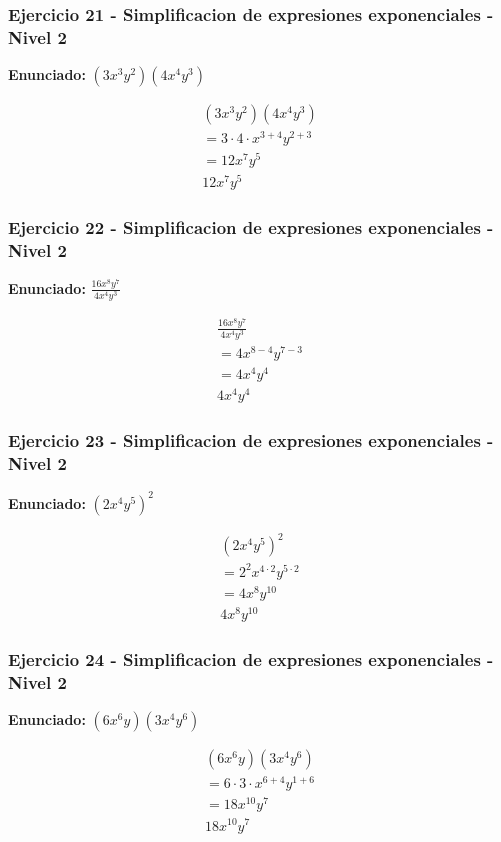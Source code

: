 \documentclass[12pt,a4paper]{article}
\begin{document}
\subsubsection*{Ejercicio 21 - Simplificacion de expresiones exponenciales - Nivel 2}
\textbf{Enunciado:} \((3x^{3}y^{2})(4x^{4}y^{3})\)

\[
\begin{aligned}
(3x^{3}y^{2})(4x^{4}y^{3})\\
=3\cdot 4\cdot x^{3+4}y^{2+3}\\
=12x^{7}y^{5}\\
\boxed{12x^{7}y^{5}}
\end{aligned}
\]


\subsubsection*{Ejercicio 22 - Simplificacion de expresiones exponenciales - Nivel 2}
\textbf{Enunciado:} \(\frac{16x^{8}y^{7}}{4x^{4}y^{3}}\)

\[
\begin{aligned}
\frac{16x^{8}y^{7}}{4x^{4}y^{3}}\\
=4x^{8-4}y^{7-3}\\
=4x^{4}y^{4}\\
\boxed{4x^{4}y^{4}}
\end{aligned}
\]


\subsubsection*{Ejercicio 23 - Simplificacion de expresiones exponenciales - Nivel 2}
\textbf{Enunciado:} \(\left(2x^{4}y^{5}\right)^{2}\)

\[
\begin{aligned}
\left(2x^{4}y^{5}\right)^{2}\\
=2^{2}x^{4\cdot 2}y^{5\cdot 2}\\
=4x^{8}y^{10}\\
\boxed{4x^{8}y^{10}}
\end{aligned}
\]


\subsubsection*{Ejercicio 24 - Simplificacion de expresiones exponenciales - Nivel 2}
\textbf{Enunciado:} \((6x^{6}y)(3x^{4}y^{6})\)

\[
\begin{aligned}
(6x^{6}y)(3x^{4}y^{6})\\
=6\cdot 3\cdot x^{6+4}y^{1+6}\\
=18x^{10}y^{7}\\
\boxed{18x^{10}y^{7}}
\end{aligned}
\]
\end{document}
